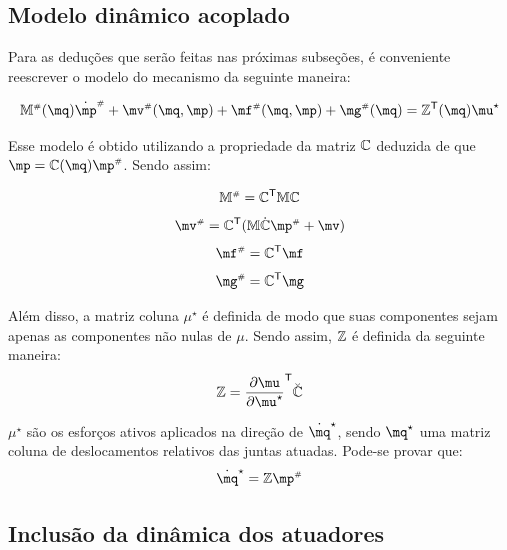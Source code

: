 \documentclass[a4paper,11pt,brazil,fleqn]{article}
\begin{document}
\subsection{Modelo din\^amico acoplado}\label{S04-3}

Para as dedu\c{c}\~oes que ser\~ao feitas nas pr\'oximas subse\c{c}\~oes, \'e conveniente reescrever o modelo do mecanismo da seguinte maneira:

\begin{equation} \label{eq:ModeloAcoplado}
\mM\ssh(\mq) \dot{\mp}\ssh + \mv\ssh(\mq,\mp) + \mf\ssh(\mq,\mp) + \mg\ssh(\mq) = \mZ^\msT (\mq) \mu^\star
\end{equation}

Esse modelo \'e obtido utilizando a propriedade da matriz $\mathbb{C}$ deduzida de que $\mp = \mC(\mq) \mp\ssh$. Sendo assim:

\begin{equation}
\mathbb{M}^{\scriptscriptstyle \#} = \mathbb{C}^{\mathsf{T}} \mathbb{M} \mathbb{C}
\end{equation}
\begin{equation}
\mv\ssh = \mC^\msT ( \mM \dot{\mC} \mp\ssh + \mv )
\end{equation}
\begin{equation}
\mf\ssh = \mC^\msT \mf
\end{equation}
\begin{equation}
\mg\ssh = \mC^\msT \mg
\end{equation}

Al\'em disso, a matriz coluna $\mu^\star$ \'e definida de modo que suas componentes sejam apenas as componentes n\~ao nulas de $\mu$. Sendo assim, $\mathbb{Z}$ \'e definida da seguinte maneira:
\begin{equation}
\mZ = \displaystyle\frac{\partial \mu}{\partial \mu^\star}^\msT \breve{\mC}
\end{equation}

$\mu^\star$ s\~ao os esfor\c{c}os ativos aplicados na dire\c{c}\~ao de $\dot{\mq}^\star$, sendo $\mq^\star$ uma matriz coluna de deslocamentos relativos das juntas atuadas. Pode-se provar que:
\begin{equation} \label{eq:qstar}
\dot{\mq}^\star = \mZ \mp\ssh
\end{equation}

\subsection{Inclus\~ao da din\^amica dos atuadores}\label{S04-4}

\end{document}
